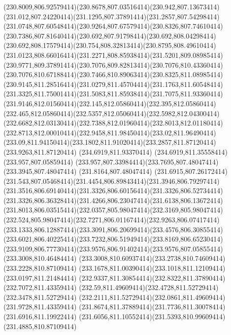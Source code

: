 {{	\curveto(230.8009,806.92579414)(230.8678,807.03516414)(230.942,807.13673414)
	\curveto(231.012,807.24220414)(231.1295,807.37891414)(231.2857,807.54298414)
	\curveto(231.0748,807.60548414)(230.9264,807.67579414)(230.8326,807.74610414)
	\curveto(230.7386,807.81640414)(230.692,807.91798414)(230.692,808.04298414)
	\curveto(230.692,808.17579414)(230.754,808.32813414)(230.8795,808.49610414)
	\curveto(231.0123,808.66016414)(231.2271,808.85938414)(231.5201,809.08985414)
	\curveto(230.9771,809.37891414)(230.7076,809.82813414)(230.7076,810.43360414)
	\curveto(230.7076,810.67188414)(230.7466,810.89063414)(230.8325,811.08985414)
	\curveto(230.9145,811.28516414)(231.0279,811.45704414)(231.1763,811.60548414)
	\curveto(231.3325,811.75001414)(231.5083,811.85938414)(231.7075,811.93360414)
	\curveto(231.9146,812.01560414)(232.145,812.05860414)(232.395,812.05860414)
	\curveto(232.465,812.05860414)(232.5357,812.05060414)(232.5982,812.04300414)
	\curveto(232.6682,812.03130414)(232.7388,812.01960414)(232.8013,812.01180414)
	\curveto(232.8713,812.00010414)(232.9458,811.98450414)(233.02,811.96490414)
	\curveto(233.09,811.94150414)(233.1802,811.91020414)(233.2857,811.87120414)
	\lineto(233.9263,811.87120414)
	\lineto(234.6919,811.93370414)
	\lineto(234.6919,811.35558414)
	\closepath
	\moveto(233.957,807.05859414)
	\curveto(233.957,807.33984414)(233.7695,807.48047414)(233.3945,807.48047414)
	\lineto(231.8164,807.48047414)
	\lineto(231.6915,807.26172414)
	\curveto(231.543,807.05468414)(231.4454,806.89843414)(231.3946,806.79297414)
	\curveto(231.3516,806.69140414)(231.3326,806.60156414)(231.3326,806.52734414)
	\curveto(231.3326,806.36328414)(231.4266,806.23047414)(231.6138,806.13672414)
	\curveto(231.8013,806.03515414)(232.0357,805.98047414)(232.3169,805.98047414)
	\curveto(232.524,805.98047414)(232.7271,806.01167414)(232.9263,806.07417414)
	\curveto(233.1333,806.12887414)(233.3091,806.20699414)(233.4576,806.30855414)
	\curveto(233.6021,806.40225414)(233.7232,806.51949414)(233.8169,806.65230414)
	\curveto(233.9109,806.77730414)(233.9576,806.91402414)(233.9576,807.05855414)
	\closepath
	\moveto(233.3008,810.46484414)
	\curveto(233.3008,810.60937414)(233.2738,810.74609414)(233.2228,810.87109414)
	\curveto(233.1678,811.00390414)(233.1018,811.12109414)(233.0197,811.21484414)
	\curveto(232.9337,811.30854414)(232.8322,811.37890414)(232.7072,811.43359414)
	\curveto(232.59,811.49609414)(232.4728,811.52729414)(232.3478,811.52729414)
	\curveto(232.2111,811.52729414)(232.0861,811.49609414)(231.9728,811.43359414)
	\curveto(231.8674,811.37889414)(231.7736,811.30078414)(231.6916,811.19922414)
	\curveto(231.6056,811.10552414)(231.5393,810.99609414)(231.4885,810.87109414)
}}
